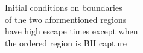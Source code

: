 \documentclass[preview]{standalone}
\begin{document}
Initial conditions on boundaries\\of the two aformentioned regions\\have high escape times except when\\the ordered region is BH capture\\
\end{document}
